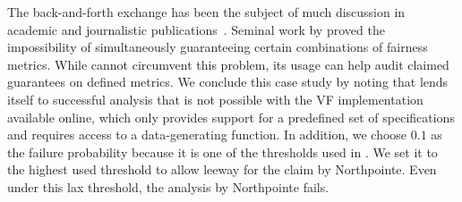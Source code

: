 The back-and-forth exchange has been the subject of much discussion in academic and journalistic publications~\citep{feller2016computer, washington2018argue}.
Seminal work by \citet{kleinberg2017inherent} proved the impossibility of simultaneously guaranteeing certain combinations of fairness metrics.
While \AVOIRmethodname{} cannot circumvent this problem, its usage can help audit claimed guarantees on defined metrics.
We conclude this case study by noting that \AVOIRmethodname{} lends itself to successful analysis that is not possible with the VF implementation available online, which only provides support for a predefined set of specifications and requires access to a data-generating function.
In addition, we choose $0.1$ as the failure probability because it is one of the thresholds used in \cite{angwin2016machine}.  
We set it to the highest used threshold to allow leeway for the claim by Northpointe.
Even under this lax threshold, the analysis by Northpointe fails.